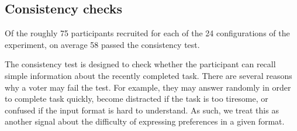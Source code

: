 \documentclass[runningheads]{llncs}
\newcommand{\kibitz}[2]{\ifnum\Comments=1{\color{#1}{#2}}\fi}
\newcommand{\rf}[1]{\kibitz{blue}{[Roy says:#1]}}
\newcommand{\gb}[1]{\kibitz{brown}{[GB:#1]}}
\begin{document}
\subsection{Consistency checks}

Of the roughly 75 participants  recruited for each of the 24 configurations of the experiment, on average 58 passed the consistency test. 

The consistency test  is designed to check whether the participant can recall simple information about the recently completed task. 
%
There are several reasons why a voter may fail the test. For example, they may answer randomly in order to complete task quickly,  become  distracted  if the task is too tiresome, or confused if the input format is hard to understand. As such, we  treat this as another signal about the difficulty of expressing  preferences in a given format. 







\end{document}
